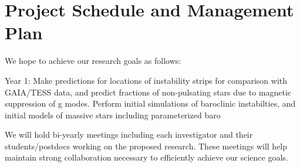 \section{Project Schedule and Management Plan}

We hope to achieve our research goals as follows:

Year 1: Make predictions for locations of instability strips for comparison with GAIA/TESS data, and predict fractions of non-pulsating stars due to magnetic suppression of g modes. Perform initial simulations of baroclinic instabilties, and initial models of massive stars including parameterized baro 

We will  hold bi-yearly meetings including each investigator and their students/postdocs working on the proposed research. These meetings will help maintain strong collaboration necessary to efficiently achieve our science goals.
